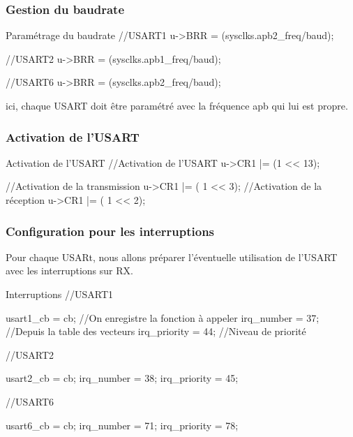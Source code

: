 \subsubsection{Gestion du baudrate}

\begin{Cpp}{Paramétrage du baudrate}
//USART1
u->BRR = (sysclks.apb2_freq/baud);

//USART2
u->BRR = (sysclks.apb1_freq/baud);

//USART6
u->BRR = (sysclks.apb2_freq/baud);
\end{Cpp}

ici, chaque USART doit être paramétré avec la fréquence apb qui lui est propre.\\


\subsubsection{Activation de l'USART}

\begin{Cpp}{Activation de l'USART}
//Activation de l'USART
u->CR1 |=	(1 << 13);

//Activation de la transmission 
u->CR1 |=	( 1 << 3);
//Activation de la réception
u->CR1 |=	( 1 << 2);
\end{Cpp}


\subsubsection{Configuration pour les interruptions}

Pour chaque USARt, nous allons préparer l'éventuelle utilisation de l'USART avec les interruptions sur RX.

\begin{Cpp}{Interruptions}
//USART1

usart1_cb = cb;     //On enregistre la fonction à appeler
irq_number = 37;    //Depuis la table des vecteurs
irq_priority = 44;  //Niveau de priorité

//USART2

usart2_cb = cb;
irq_number = 38;
irq_priority = 45;

//USART6

usart6_cb = cb;
irq_number = 71;
irq_priority = 78;

\end{Cpp}


